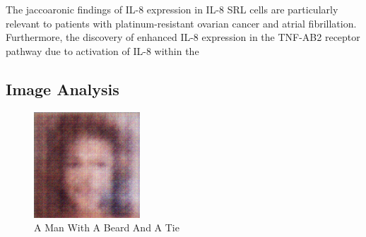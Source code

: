 \documentclass{article}%
\begin{document}
The jaccoaronic findings of IL{-}8 expression in IL{-}8 SRL cells are particularly relevant to patients with platinum{-}resistant ovarian cancer and atrial fibrillation. Furthermore, the discovery of enhanced IL{-}8 expression in the TNF{-}AB2 receptor pathway due to activation of IL{-}8 within the

%
\subsection{Image Analysis}%
\label{subsec:ImageAnalysis}%


\begin{figure}[h!]%
\centering%
\includegraphics[width=150px]{500_fake_images/samples_5_236.png}%
\caption{A Man With A Beard And A Tie}%
\end{figure}

%
\end{document}
